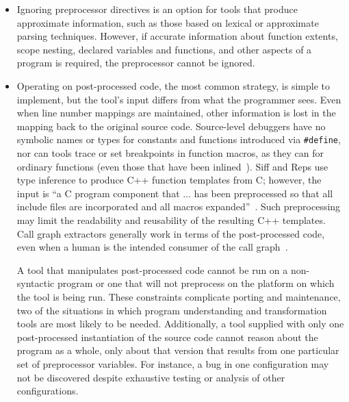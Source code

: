 \documentclass[10pt]{article}
\begin{document}
\begin{itemize}

\item Ignoring preprocessor directives is an option for tools that produce
  approximate information, such as those based on lexical or approximate
  parsing techniques.  However, if accurate information about function
  extents, scope nesting, declared variables and functions, and other
  aspects of a program is required, the preprocessor cannot be ignored.

\item Operating on post-processed code, the most common strategy, is
  simple to implement, but the tool's input differs from what the
  programmer sees.  Even when line number mappings are maintained, other
  information is lost in the mapping back to the original source code.
  Source-level debuggers have no symbolic names or types for constants and
  functions introduced via {\tt \#define}, nor can tools trace or set
  breakpoints in function macros, as they can for ordinary functions (even
  those that have been inlined~\cite{Zellweger83:TR}).  Siff and Reps use
  type inference to produce C++ function templates from C; however, the
  input is ``a C program component that $\ldots$ has been preprocessed so
  that all include files are incorporated and all macros
  expanded''~\cite[p.~145]{Siff-fse96}.  Such preprocessing may limit the
  readability and reusability of the resulting C++ templates.  Call graph
  extractors generally work in terms of the post-processed code, even when
  a human is the intended consumer of the call graph~\cite{Murphy-icse18}.

  
  A tool that manipulates post-processed code cannot be run on a
  non-syntactic program or one that will not preprocess on the platform on
  which the tool is being run.  These constraints complicate porting and
  maintenance, two of the situations in which program understanding and
  transformation tools are most likely to be needed.  Additionally, a tool
  supplied with only one post-processed instantiation of the source code
  cannot reason about the program as a whole, only about that version that
  results from one particular set of preprocessor variables.  For instance,
  a bug in one configuration may not be discovered despite exhaustive
  testing or analysis of other configurations.


\end{itemize}
\end{document}
